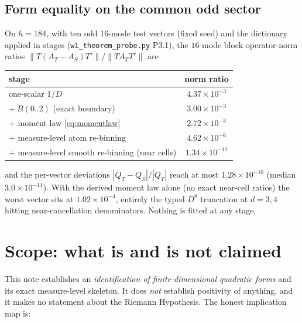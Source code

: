 \documentclass[11pt,a4paper]{article}
\theoremstyle{remark}
\begin{document}
\subsection{Form equality on the common odd sector}
On $h=184$, with ten odd $16$-mode test vectors (fixed seed) and the
dictionary applied in stages (\texttt{w1\_theorem\_probe.py} P3.1),
the $16$-mode block operator-norm ratios
$\lVert T(A_T-A_S)T'\rVert/\lVert TA_TT'\rVert$ are
\begin{center}
\begin{tabular}{lc}
\toprule
stage & norm ratio\\
\midrule
one-scalar $1/D$ & $4.37\times10^{-3}$\\
$+\ \tilde B(0..2)$ (exact boundary) & $3.00\times10^{-3}$\\
$+$ moment law \eqref{eq:momentlaw} & $2.72\times10^{-3}$\\
$+$ measure-level atom re-binning & $4.62\times10^{-6}$\\
$+$ measure-level smooth re-binning (near cells) & $1.34\times10^{-11}$\\
\bottomrule
\end{tabular}
\end{center}
and the per-vector deviations $|Q_T-Q_S|/|Q_T|$ reach at most
$1.28\times10^{-10}$ (median $3.0\times10^{-11}$).  With the derived
moment law alone (no exact near-cell ratios) the worst vector sits at
$1.02\times10^{-4}$, entirely the typed $D^8$ truncation at $d=3,4$
hitting near-cancellation denominators.  Nothing is fitted at any
stage.

\section{Scope: what is and is not claimed}\label{sec:scope}

This note establishes an \emph{identification of finite-dimensional
quadratic forms} and its exact measure-level skeleton.  It does
\emph{not} establish positivity of anything, and it makes no statement
about the Riemann Hypothesis.  The honest implication map is:
\end{document}
